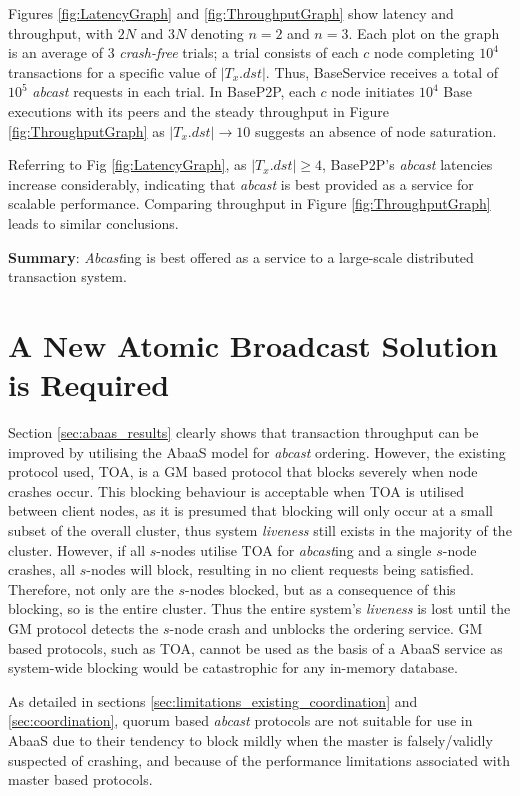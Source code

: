 Figures \ref{fig:LatencyGraph} and \ref{fig:ThroughputGraph} show latency and throughput, with $2N$ and $3N$ denoting $n=2$ and $n=3$. Each plot on the graph is an average of 3 \emph{crash-free} trials; a trial consists of each $c$ node completing $10^4$ transactions for a specific value of $|T_x.dst|$. Thus, BaseService receives a total of $10^5$ \emph{abcast} requests in each trial. In BaseP2P, each $c$ node initiates $10^4$ Base executions with its peers and the steady throughput in Figure \ref{fig:ThroughputGraph} as $|T_x.dst| \rightarrow 10$ suggests an absence of node saturation.

Referring to Fig \ref{fig:LatencyGraph}, as $|T_x.dst| \geq 4$, BaseP2P's \emph{abcast} latencies increase considerably, indicating that \emph{abcast} is best provided as a service for scalable performance. Comparing throughput in Figure \ref{fig:ThroughputGraph} leads to similar conclusions.

\noindent \textbf{Summary}: \emph{Abcast}ing is best offered as a service to a large-scale distributed transaction system. 

\section{A New Atomic Broadcast Solution is Required}
Section \ref{sec:abaas_results} clearly shows that transaction throughput can be improved by utilising the \textsf{AbaaS} model for \emph{abcast} ordering.  However, the existing protocol used, TOA, is a GM based protocol that blocks severely when node crashes occur.  This blocking behaviour is acceptable when TOA is utilised between client nodes, as it is presumed that blocking will only occur at a small subset of the overall cluster, thus system \emph{liveness} still exists in the majority of the cluster.  However, if all $s$-nodes utilise TOA for \emph{abcast}ing and a single $s$-node crashes, all $s$-nodes will block, resulting in no client requests being satisfied. Therefore, not only are the $s$-nodes blocked, but as a consequence of this blocking, so is the entire cluster.  Thus the entire system's \emph{liveness} is lost until the GM protocol detects the $s$-node crash and unblocks the ordering service.  GM based protocols, such as TOA, cannot be used as the basis of a \textsf{AbaaS} service as system-wide blocking would be catastrophic for any in-memory database.  

As detailed in sections \ref{sec:limitations_existing_coordination} and \ref{sec:coordination}, quorum based \emph{abcast} protocols are not suitable for use in \textsf{AbaaS} due to their tendency to block mildly when the master is falsely/validly suspected of crashing, and because of the performance limitations associated with master based protocols.  

